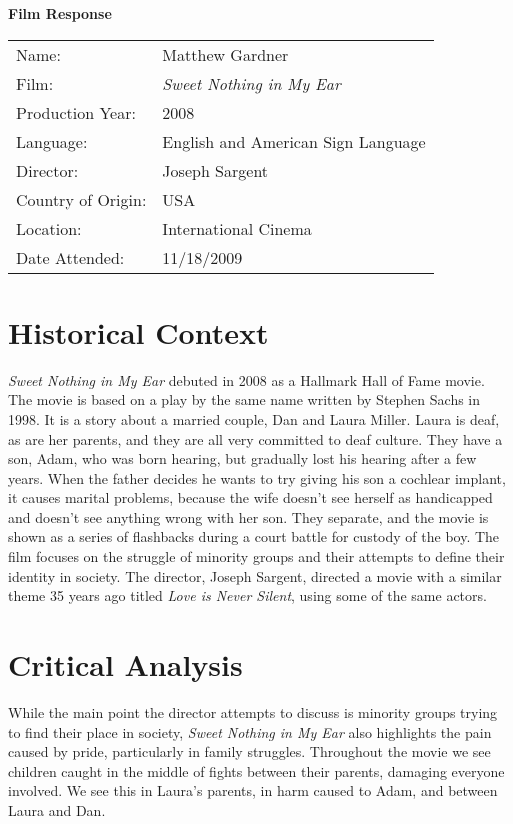 \documentclass[onecolumn, 12pt]{article}
\title{}
\author{Matthew Gardner}
\date{}
\begin{document}
\textbf{Film Response}

\begin{tabular}{ll}
  Name:&Matthew Gardner \\
  Film:&\emph{Sweet Nothing in My Ear} \\
  Production Year:&2008 \\
  Language:&English and American Sign Language \\
  Director:&Joseph Sargent \\
  Country of Origin:& USA \\
  Location:&International Cinema \\
  Date Attended:&11/18/2009 \\
\end{tabular}

\section*{Historical Context}

\emph{Sweet Nothing in My Ear} debuted in 2008 as a Hallmark Hall of Fame
movie.  The movie is based on a play by the same name written by Stephen Sachs
in 1998.  It is a story about a married couple, Dan and Laura Miller.  Laura is
deaf, as are her parents, and they are all very committed to deaf culture.
They have a son, Adam, who was born hearing, but gradually lost his hearing
after a few years.  When the father decides he wants to try giving his son a
cochlear implant, it causes marital problems, because the wife doesn't see
herself as handicapped and doesn't see anything wrong with her son.  They
separate, and the movie is shown as a series of flashbacks during a court
battle for custody of the boy.  The film focuses on the struggle of minority
groups and their attempts to define their identity in society.  The director,
Joseph Sargent, directed a movie with a similar theme 35 years ago titled
\emph{Love is Never Silent}, using some of the same actors.

\section*{Critical Analysis}

While the main point the director attempts to discuss is minority groups trying
to find their place in society, \emph{Sweet Nothing in My Ear} also highlights
the pain caused by pride, particularly in family struggles.  Throughout the 
movie we see children caught in the middle of fights between their parents,
damaging everyone involved.  We see this in Laura's parents, in harm caused to
Adam, and between Laura and Dan.
\end{document}
